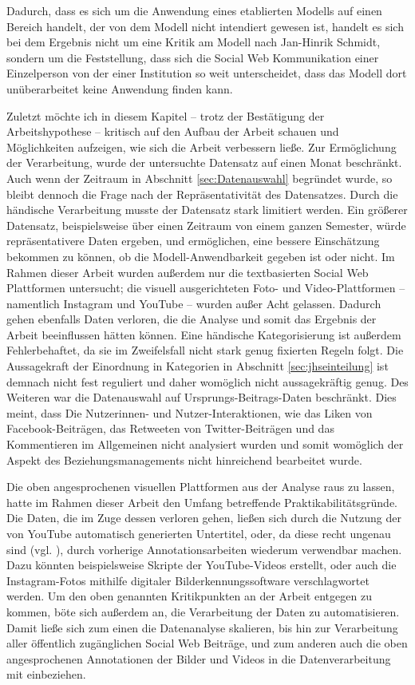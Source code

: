 Dadurch, dass es sich um die Anwendung eines etablierten Modells auf einen Bereich handelt, der von dem Modell nicht intendiert gewesen ist, handelt es sich bei dem Ergebnis nicht um eine Kritik am Modell nach Jan-Hinrik Schmidt, sondern um die Feststellung, dass sich die Social Web Kommunikation einer Einzelperson von der einer Institution so weit unterscheidet, dass das Modell dort unüberarbeitet keine Anwendung finden kann.

Zuletzt möchte ich in diesem Kapitel -- trotz der Bestätigung der Arbeitshypothese -- kritisch auf den Aufbau der Arbeit schauen und Möglichkeiten aufzeigen, wie sich die Arbeit verbessern ließe. Zur Ermöglichung der Verarbeitung, wurde der untersuchte Datensatz auf einen Monat beschränkt. Auch wenn der Zeitraum in Abschnitt \ref{sec:Datenauswahl} begründet wurde, so bleibt dennoch die Frage nach der Repräsentativität des Datensatzes. Durch die händische Verarbeitung musste der Datensatz stark limitiert werden. Ein größerer Datensatz, beispielsweise über einen Zeitraum von einem ganzen Semester, würde repräsentativere Daten ergeben, und ermöglichen, eine bessere Einschätzung bekommen zu können, ob die Modell-Anwendbarkeit gegeben ist oder nicht. 
Im Rahmen dieser Arbeit wurden außerdem nur die textbasierten Social Web Plattformen untersucht; die visuell ausgerichteten Foto- und Video-Plattformen -- namentlich Instagram und YouTube -- wurden außer Acht gelassen. Dadurch gehen ebenfalls Daten verloren, die die Analyse und somit das Ergebnis der Arbeit beeinflussen hätten können. Eine händische Kategorisierung ist außerdem Fehlerbehaftet, da sie im Zweifelsfall nicht stark genug fixierten Regeln folgt. Die Aussagekraft der Einordnung in Kategorien in Abschnitt \ref{sec:jhseinteilung} ist demnach nicht fest reguliert und daher womöglich nicht aussagekräftig genug. 
Des Weiteren war die Datenauswahl auf Ursprungs-Beitrags-Daten beschränkt. Dies meint, dass Die Nutzerinnen- und Nutzer-Interaktionen, wie das Liken von Facebook-Beiträgen, das Retweeten von Twitter-Beiträgen und das Kommentieren im Allgemeinen nicht analysiert wurden und somit womöglich der Aspekt des Beziehungsmanagements nicht hinreichend bearbeitet wurde.

Die oben angesprochenen visuellen Plattformen aus der Analyse raus zu lassen, hatte im Rahmen dieser Arbeit den Umfang betreffende Praktikabilitätsgründe. Die Daten, die im Zuge dessen verloren gehen, ließen sich durch die Nutzung der von YouTube automatisch generierten Untertitel, oder, da diese recht ungenau sind (vgl. \cite{parton2016video}), durch vorherige Annotationsarbeiten wiederum verwendbar machen.  Dazu könnten beispielsweise Skripte der YouTube-Videos erstellt, oder auch die Instagram-Fotos mithilfe digitaler Bilderkennungssoftware verschlagwortet werden. Um den oben genannten Kritikpunkten an der Arbeit entgegen zu kommen, böte sich außerdem an, die Verarbeitung der Daten zu automatisieren. Damit ließe sich zum einen die Datenanalyse skalieren, bis hin zur Verarbeitung aller öffentlich zugänglichen Social Web Beiträge, und zum anderen auch die oben angesprochenen Annotationen der Bilder und Videos in die Datenverarbeitung mit einbeziehen.

